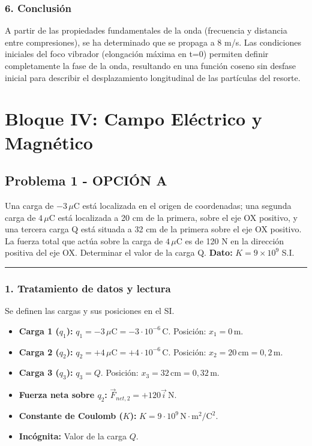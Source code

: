 \subsubsection*{6. Conclusión}
\begin{cajaconclusion}
A partir de las propiedades fundamentales de la onda (frecuencia y distancia entre compresiones), se ha determinado que se propaga a 8 m/s. Las condiciones iniciales del foco vibrador (elongación máxima en t=0) permiten definir completamente la fase de la onda, resultando en una función coseno sin desfase inicial para describir el desplazamiento longitudinal de las partículas del resorte.
\end{cajaconclusion}

\newpage

\section{Bloque IV: Campo Eléctrico y Magnético}
\label{sec:em_2001_sep_ext}

\subsection{Problema 1 - OPCIÓN A}
\label{subsec:4A_2001_sep_ext}

\begin{cajaenunciado}
Una carga de $-3\,\mu\text{C}$ está localizada en el origen de coordenadas; una segunda carga de $4\,\mu\text{C}$ está localizada a 20 cm de la primera, sobre el eje OX positivo, y una tercera carga Q está situada a 32 cm de la primera sobre el eje OX positivo. La fuerza total que actúa sobre la carga de $4\,\mu\text{C}$ es de 120 N en la dirección positiva del eje OX. Determinar el valor de la carga Q.
\textbf{Dato:} $K=9\times10^{9}$ S.I.
\end{cajaenunciado}
\hrule

\subsubsection*{1. Tratamiento de datos y lectura}
Se definen las cargas y sus posiciones en el SI.
\begin{itemize}
    \item \textbf{Carga 1 ($q_1$):} $q_1 = -3 \, \mu\text{C} = -3 \cdot 10^{-6} \, \text{C}$. Posición: $x_1 = 0 \, \text{m}$.
    \item \textbf{Carga 2 ($q_2$):} $q_2 = +4 \, \mu\text{C} = +4 \cdot 10^{-6} \, \text{C}$. Posición: $x_2 = 20 \, \text{cm} = 0,2 \, \text{m}$.
    \item \textbf{Carga 3 ($q_3$):} $q_3 = Q$. Posición: $x_3 = 32 \, \text{cm} = 0,32 \, \text{m}$.
    \item \textbf{Fuerza neta sobre $q_2$:} $\vec{F}_{net,2} = +120 \vec{i} \, \text{N}$.
    \item \textbf{Constante de Coulomb ($K$):} $K = 9 \cdot 10^9 \, \text{N}\cdot\text{m}^2/\text{C}^2$.
    \item \textbf{Incógnita:} Valor de la carga $Q$.
\end{itemize}

